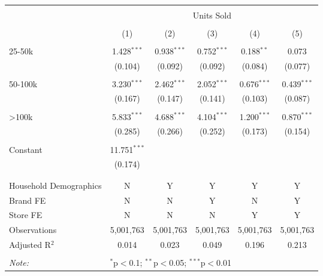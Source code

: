 
\begin{table}[!htbp] \centering 
  \caption{} 
  \label{} 
\begin{tabular}{@{\extracolsep{5pt}}lccccc} 
\\[-1.8ex]\hline 
\hline \\[-1.8ex] 
 & \multicolumn{5}{c}{Units Sold} \\ 
\cline{2-6} 
\\[-1.8ex] & (1) & (2) & (3) & (4) & (5)\\ 
\hline \\[-1.8ex] 
 25-50k & 1.428$^{***}$ & 0.938$^{***}$ & 0.752$^{***}$ & 0.188$^{**}$ & 0.073 \\ 
  & (0.104) & (0.092) & (0.092) & (0.084) & (0.077) \\ 
  & & & & & \\ 
 50-100k & 3.230$^{***}$ & 2.462$^{***}$ & 2.052$^{***}$ & 0.676$^{***}$ & 0.439$^{***}$ \\ 
  & (0.167) & (0.147) & (0.141) & (0.103) & (0.087) \\ 
  & & & & & \\ 
 >100k & 5.833$^{***}$ & 4.688$^{***}$ & 4.104$^{***}$ & 1.200$^{***}$ & 0.870$^{***}$ \\ 
  & (0.285) & (0.266) & (0.252) & (0.173) & (0.154) \\ 
  & & & & & \\ 
 Constant & 11.751$^{***}$ &  &  &  &  \\ 
  & (0.174) &  &  &  &  \\ 
  & & & & & \\ 
\hline \\[-1.8ex] 
Household Demographics & N & Y & Y & Y & Y \\ 
Brand FE & N & N & Y & N & Y \\ 
Store FE & N & N & N & Y & Y \\ 
Observations & 5,001,763 & 5,001,763 & 5,001,763 & 5,001,763 & 5,001,763 \\ 
Adjusted R$^{2}$ & 0.014 & 0.023 & 0.049 & 0.196 & 0.213 \\ 
\hline 
\hline \\[-1.8ex] 
\textit{Note:}  & \multicolumn{5}{l}{$^{*}$p$<$0.1; $^{**}$p$<$0.05; $^{***}$p$<$0.01} \\ 
\end{tabular} 
\end{table} 
